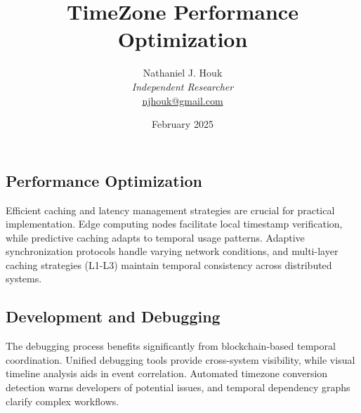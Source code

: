 \documentclass{article}
\title{TimeZone Performance Optimization}
\author{Nathaniel J. Houk\\
\textit{Independent Researcher}\\
\href{mailto:njhouk@gmail.com}{njhouk@gmail.com}}
\date{February 2025}
\begin{document}
\maketitle
\tableofcontents

\subsection{Performance Optimization}
Efficient caching and latency management strategies are crucial for practical implementation. Edge computing nodes facilitate local timestamp verification, while predictive caching adapts to temporal usage patterns. Adaptive synchronization protocols handle varying network conditions, and multi-layer caching strategies (L1-L3) maintain temporal consistency across distributed systems.

\subsection{Development and Debugging}
The debugging process benefits significantly from blockchain-based temporal coordination. Unified debugging tools provide cross-system visibility, while visual timeline analysis aids in event correlation. Automated timezone conversion detection warns developers of potential issues, and temporal dependency graphs clarify complex workflows.
\end{document}
